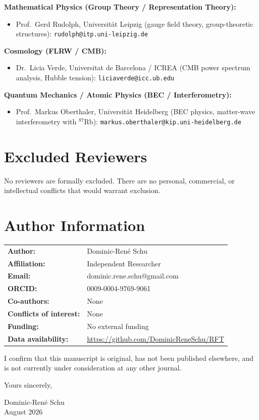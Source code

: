 \documentclass[12pt]{article}
\begin{document}
\noindent\textbf{Mathematical Physics (Group Theory / Representation Theory):}

\begin{itemize}
\item Prof.\ Gerd Rudolph, Universit\"at Leipzig (gauge field theory,
  group-theoretic structures): \texttt{rudolph@itp.uni-leipzig.de}
\end{itemize}

\noindent\textbf{Cosmology (FLRW / CMB):}

\begin{itemize}
\item Dr.\ Licia Verde, Universitat de Barcelona / ICREA (CMB power spectrum analysis,
  Hubble tension): \texttt{liciaverde@icc.ub.edu}
\end{itemize}

\noindent\textbf{Quantum Mechanics / Atomic Physics (BEC / Interferometry):}

\begin{itemize}
\item Prof.\ Markus Oberthaler, Universit\"at Heidelberg (BEC physics,
  matter-wave interferometry with ${}^{87}$Rb): \texttt{markus.oberthaler@kip.uni-heidelberg.de}
\end{itemize}

\section*{Excluded Reviewers}

No reviewers are formally excluded. There are no personal, commercial, or intellectual
conflicts that would warrant exclusion.

\section*{Author Information}

\begin{tabular}{ll}
\textbf{Author:} & Dominic-Ren\'e Schu \\
\textbf{Affiliation:} & Independent Researcher \\
\textbf{Email:} & dominic.rene.schu@gmail.com \\
\textbf{ORCID:} & 0009-0004-9769-9061 \\
\textbf{Co-authors:} & None \\
\textbf{Conflicts of interest:} & None \\
\textbf{Funding:} & No external funding \\
\textbf{Data availability:} & \url{https://github.com/DominicReneSchu/RFT} \\
\end{tabular}

\bigskip
\noindent I confirm that this manuscript is original, has not been published elsewhere,
and is not currently under consideration at any other journal.

\bigskip\bigskip
\noindent Yours sincerely,

\bigskip\bigskip
\noindent Dominic-Ren\'e Schu\\
August 2026
\end{document}
